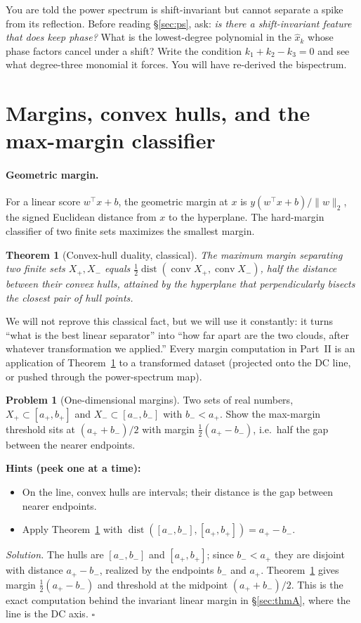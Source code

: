 \documentclass[11pt]{article}
\theoremstyle{plain}
\newtheorem{theorem}{Theorem}[section]
\theoremstyle{definition}
\newtheorem{problem}{Problem}[section]
\theoremstyle{remark}
\newenvironment{hints}{\par\smallskip\noindent\textbf{\color{hintc}Hints (peek one at a time):}\begin{itemize}}{\end{itemize}\par\smallskip}
\newenvironment{solution}{\par\smallskip\noindent\textit{Solution.}\;}{\hfill$\square$\par\smallskip}
\newcommand{\discover}[2]{\par\smallskip\noindent{\color{discc}\textbf{Find-the-question: #1}}\;#2\par\smallskip}
\newcommand{\conv}{\operatorname{conv}}
\newcommand{\dist}{\operatorname{dist}}
\begin{document}
\discover{a phase-blind invariant}{You are told the power spectrum is shift-invariant but cannot separate a spike
from its reflection. Before reading \S\ref{sec:ps}, ask: \emph{is there a shift-invariant feature that does keep
phase?} What is the lowest-degree polynomial in the $\hat x_k$ whose phase factors cancel under a shift? Write the
condition $k_1+k_2-k_3=0$ and see what degree-three monomial it forces. You will have re-derived the bispectrum.}

\section{Margins, convex hulls, and the max-margin classifier}\label{sec:margin}

\paragraph{Geometric margin.} For a linear score $w^\top x+b$, the geometric margin at $x$ is
$y(w^\top x+b)/\|w\|_2$, the signed Euclidean distance from $x$ to the hyperplane. The hard-margin classifier of two
finite sets maximizes the smallest margin.

\begin{theorem}[Convex-hull duality, classical]\label{thm:hull}
The maximum margin separating two finite sets $X_+,X_-$ equals $\tfrac12\dist(\conv X_+,\conv X_-)$, half the
distance between their convex hulls, attained by the hyperplane that perpendicularly bisects the closest pair of hull
points.
\end{theorem}

We will not reprove this classical fact, but we will use it constantly: it turns ``what is the best linear
separator'' into ``how far apart are the two clouds, after whatever transformation we applied.'' Every margin
computation in Part~II is an application of Theorem~\ref{thm:hull} to a transformed dataset (projected onto the DC
line, or pushed through the power-spectrum map).

\begin{problem}[One-dimensional margins]\label{pr:1d}
Two sets of real numbers, $X_+\subset[a_+,b_+]$ and $X_-\subset[a_-,b_-]$ with $b_-<a_+$. Show the max-margin
threshold sits at $(a_++b_-)/2$ with margin $\tfrac12(a_+-b_-)$, i.e.\ half the gap between the nearer endpoints.
\end{problem}
\begin{hints}
\item On the line, convex hulls are intervals; their distance is the gap between nearer endpoints.
\item Apply Theorem~\ref{thm:hull} with $\dist([a_-,b_-],[a_+,b_+])=a_+-b_-$.
\end{hints}
\begin{solution}
The hulls are $[a_-,b_-]$ and $[a_+,b_+]$; since $b_-<a_+$ they are disjoint with distance $a_+-b_-$, realized by the
endpoints $b_-$ and $a_+$. Theorem~\ref{thm:hull} gives margin $\tfrac12(a_+-b_-)$ and threshold at the midpoint
$(a_++b_-)/2$. This is the exact computation behind the invariant linear margin in \S\ref{sec:thmA}, where the line
is the DC axis.
\end{solution}
\end{document}
